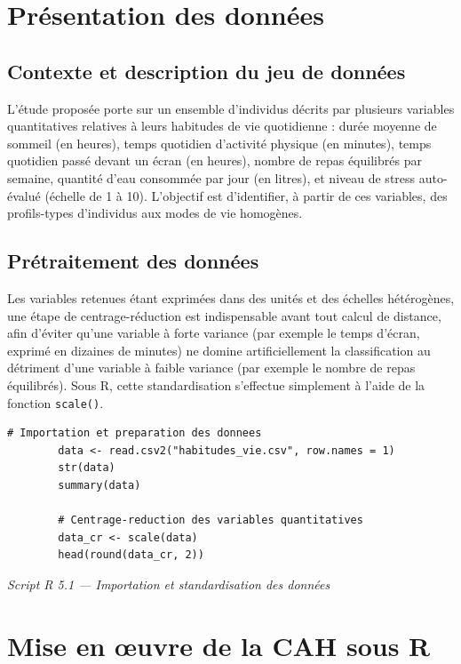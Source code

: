 \documentclass[11pt,a4paper]{report}
\newcommand{\rcaption}[1]{%
	\begin{center}\small\itshape\color{grey} #1\end{center}\vspace{4pt}
}
\begin{document}
	\chapter{Présentation des données}
	
	\section{Contexte et description du jeu de données}
	
	L'étude proposée porte sur un ensemble d'individus décrits par plusieurs variables quantitatives relatives à leurs habitudes de vie quotidienne : durée moyenne de sommeil (en heures), temps quotidien d'activité physique (en minutes), temps quotidien passé devant un écran (en heures), nombre de repas équilibrés par semaine, quantité d'eau consommée par jour (en litres), et niveau de stress auto-évalué (échelle de 1 à 10). L'objectif est d'identifier, à partir de ces variables, des profils-types d'individus aux modes de vie homogènes.
	
	\section{Prétraitement des données}
	
	Les variables retenues étant exprimées dans des unités et des échelles hétérogènes, une étape de centrage-réduction est indispensable avant tout calcul de distance, afin d'éviter qu'une variable à forte variance (par exemple le temps d'écran, exprimé en dizaines de minutes) ne domine artificiellement la classification au détriment d'une variable à faible variance (par exemple le nombre de repas équilibrés). Sous R, cette standardisation s'effectue simplement à l'aide de la fonction \texttt{scale()}.
	
	\begin{lstlisting}[style=rstyle]
		# Importation et preparation des donnees
		data <- read.csv2("habitudes_vie.csv", row.names = 1)
		str(data)
		summary(data)
		
		# Centrage-reduction des variables quantitatives
		data_cr <- scale(data)
		head(round(data_cr, 2))
	\end{lstlisting}
	\rcaption{Script R 5.1 --- Importation et standardisation des données}
	
	\chapter{Mise en œuvre de la CAH sous R}
	
\end{document}
